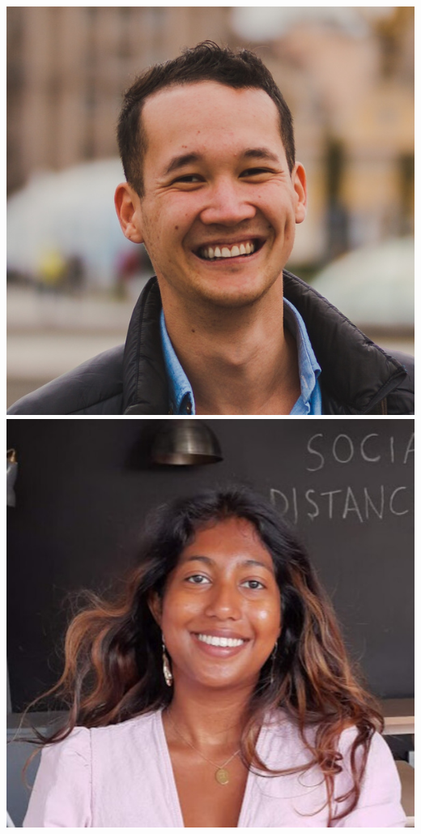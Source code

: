 \documentclass[aspectratio=169]{beamer}
\begin{document}
\begin{frame}
{        \includegraphics[width=0.10\textheight]{people/kilian_scheutwinkel.jpg}%
        \includegraphics[width=0.10\textheight]{people/metha_prathaban.jpg}%
}
\end{frame}
\end{document}
